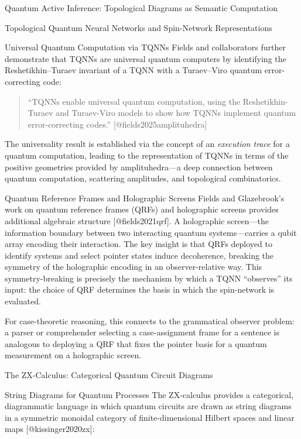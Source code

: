 \documentclass[
  ignorenonframetext,
]{beamer}
\begin{document}
\begin{frame}{Quantum Active Inference: Topological Diagrams as Semantic
Computation}
\begin{block}{Topological Quantum Neural Networks and Spin-Network
Representations}
\begin{block}{Universal Quantum Computation via TQNNs}
\protect{}\label{universal-quantum-computation-via-tqnns}
Fields and collaborators further demonstrate that TQNNs are universal
quantum computers by identifying the Reshetikhin--Turaev invariant of a
TQNN with a Turaev--Viro quantum error-correcting code:

\begin{quote}
``TQNNs enable universal quantum computation, using the
Reshetikhin-Turaev and Turaev-Viro models to show how TQNNs implement
quantum error-correcting codes.'' {[}@fields2025amplituhedra{]}
\end{quote}

The universality result is established via the concept of an
\emph{execution trace} for a quantum computation, leading to the
representation of TQNNs in terms of the positive geometries provided by
amplituhedra---a deep connection between quantum computation, scattering
amplitudes, and topological combinatorics.
\end{block}

\begin{block}{Quantum Reference Frames and Holographic Screens}
\protect{}\label{quantum-reference-frames-and-holographic-screens}
Fields and Glazebrook's work on quantum reference frames (QRFs) and
holographic screens provides additional algebraic structure
{[}@fields2021qrf{]}. A holographic screen---the information boundary
between two interacting quantum systems---carries a qubit array encoding
their interaction. The key insight is that QRFs deployed to identify
systems and select pointer states induce decoherence, breaking the
symmetry of the holographic encoding in an observer-relative way. This
symmetry-breaking is precisely the mechanism by which a TQNN
``observes'' its input: the choice of QRF determines the basis in which
the spin-network is evaluated.

For case-theoretic reasoning, this connects to the grammatical observer
problem: a parser or comprehender selecting a case-assignment frame for
a sentence is analogous to deploying a QRF that fixes the pointer basis
for a quantum measurement on a holographic screen.
\end{block}
\end{block}

\begin{block}{The ZX-Calculus: Categorical Quantum Circuit Diagrams}
\protect{}\label{the-zx-calculus-categorical-quantum-circuit-diagrams}
\begin{block}{String Diagrams for Quantum Processes}
\protect{}\label{string-diagrams-for-quantum-processes}
The ZX-calculus provides a categorical, diagrammatic language in which
quantum circuits are drawn as string diagrams in a symmetric monoidal
category of finite-dimensional Hilbert spaces and linear maps
{[}@kissinger2020zx{]}:


\end{block}
\end{block}
\end{frame}
\end{document}
